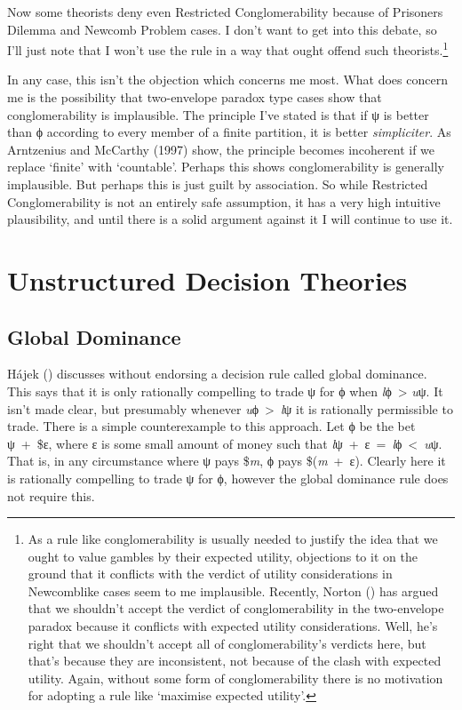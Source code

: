 \documentclass[
  11pt,
  letterpaper,
  DIV=11,
  numbers=noendperiod,
  twoside]{scrartcl}
\begin{document}
Now some theorists deny even Restricted Conglomerability because of
Prisoners Dilemma and Newcomb Problem cases. I don't want to get into
this debate, so I'll just note that I won't use the rule in a way that
ought offend such theorists.\footnote{As a rule like conglomerability is
  usually needed to justify the idea that we ought to value gambles by
  their expected utility, objections to it on the ground that it
  conflicts with the verdict of utility considerations in Newcomblike
  cases seem to me implausible. Recently, Norton
  () has argued that we shouldn't accept
  the verdict of conglomerability in the two-envelope paradox because it
  conflicts with expected utility considerations. Well, he's right that
  we shouldn't accept all of conglomerability's verdicts here, but
  that's because they are inconsistent, not because of the clash with
  expected utility. Again, without some form of conglomerability there
  is no motivation for adopting a rule like `maximise expected utility'.}

In any case, this isn't the objection which concerns me most. What does
concern me is the possibility that two-envelope paradox type cases show
that conglomerability is implausible. The principle I've stated is that
if ψ is better than ϕ according to every member of a finite partition,
it is better \emph{simpliciter}. As Arntzenius and McCarthy (1997) show,
the principle becomes incoherent if we replace `finite' with
`countable'. Perhaps this shows conglomerability is generally
implausible. But perhaps this is just guilt by association. So while
Restricted Conglomerability is not an entirely safe assumption, it has a
very high intuitive plausibility, and until there is a solid argument
against it I will continue to use it.

\section{Unstructured Decision
Theories}\label{unstructured-decision-theories}

\subsection{Global Dominance}\label{global-dominance}

Hájek () discusses without endorsing a
decision rule called global dominance. This says that it is only
rationally compelling to trade ψ for ϕ when \emph{l}ϕ~\textgreater{}
\emph{u}ψ. It isn't made clear, but presumably whenever
\emph{u}ϕ~\textgreater~\emph{l}ψ it is rationally permissible to trade.
There is a simple counterexample to this approach. Let ϕ be the bet
ψ~+~\$ε, where ε is some small amount of money such that
\emph{l}ψ~+~ε~=~\emph{l}ϕ~\textless~\emph{u}ψ. That is, in any
circumstance where ψ pays \$\emph{m}, ϕ pays \$(\emph{m}~+~ε). Clearly
here it is rationally compelling to trade ψ for ϕ, however the global
dominance rule does not require this.
\end{document}
